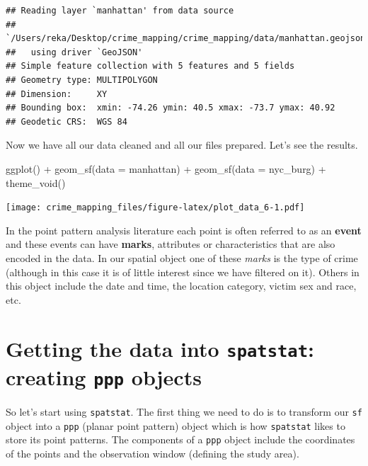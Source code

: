 \documentclass[
  krantz2]{krantz}
\makeatletter
\newenvironment{Shaded}{\begin{snugshade}}{\end{snugshade}}
\newcommand{\AttributeTok}[1]{\textcolor[rgb]{0.61,0.61,0.61}{#1}}
\newcommand{\FunctionTok}[1]{\textcolor[rgb]{0,0,0}{#1}}
\newcommand{\NormalTok}[1]{#1}
\newcommand{\SpecialCharTok}[1]{\textcolor[rgb]{0,0,0}{#1}}
\newenvironment{kframe}{%
\medskip{}
\setlength{\fboxsep}{.8em}
 \def\at@end@of@kframe{}%
 \ifinner\ifhmode%
  \def\at@end@of@kframe{\end{minipage}}%
  \begin{minipage}{\columnwidth}%
 \fi\fi%
 \def\FrameCommand##1{\hskip\@totalleftmargin \hskip-\fboxsep
 \colorbox{shadecolor}{##1}\hskip-\fboxsep
     \hskip-\linewidth \hskip-\@totalleftmargin \hskip\columnwidth}%
 \MakeFramed {\advance\hsize-\width
   \@totalleftmargin\z@ \linewidth\hsize
   \@setminipage}}%
 {\par\unskip\endMakeFramed%
 \at@end@of@kframe}
\renewenvironment{Shaded}{\begin{kframe}}{\end{kframe}}
\makeatother
\begin{document}
\begin{verbatim}
## Reading layer `manhattan' from data source 
##   `/Users/reka/Desktop/crime_mapping/crime_mapping/data/manhattan.geojson' 
##   using driver `GeoJSON'
## Simple feature collection with 5 features and 5 fields
## Geometry type: MULTIPOLYGON
## Dimension:     XY
## Bounding box:  xmin: -74.26 ymin: 40.5 xmax: -73.7 ymax: 40.92
## Geodetic CRS:  WGS 84
\end{verbatim}

Now we have all our data cleaned and all our files prepared. Let's see the results.

\begin{Shaded}
\begin{Highlighting}[]
\FunctionTok{ggplot}\NormalTok{() }\SpecialCharTok{+} 
  \FunctionTok{geom\_sf}\NormalTok{(}\AttributeTok{data =}\NormalTok{ manhattan) }\SpecialCharTok{+} 
  \FunctionTok{geom\_sf}\NormalTok{(}\AttributeTok{data =}\NormalTok{ nyc\_burg) }\SpecialCharTok{+} 
  \FunctionTok{theme\_void}\NormalTok{()}
\end{Highlighting}
\end{Shaded}

\texttt{[image: crime\_mapping\_files/figure-latex/plot\_data\_6-1.pdf]}

In the point pattern analysis literature each point is often referred to as an \textbf{event} and these events can have \textbf{marks}, attributes or characteristics that are also encoded in the data. In our spatial object one of these \emph{marks} is the type of crime (although in this case it is of little interest since we have filtered on it). Others in this object include the date and time, the location category, victim sex and race, etc.

\hypertarget{getting-the-data-into-spatstat-creating-ppp-objects}{%
\section{\texorpdfstring{Getting the data into \texttt{spatstat}: creating \texttt{ppp} objects}{Getting the data into spatstat: creating ppp objects}}\label{getting-the-data-into-spatstat-creating-ppp-objects}}

So let's start using \texttt{spatstat}. The first thing we need to do is to transform our \texttt{sf} object into a \texttt{ppp} (planar point pattern) object which is how \texttt{spatstat} likes to store its point patterns. The components of a \texttt{ppp} object include the coordinates of the points and the observation window (defining the study area).
\end{document}
